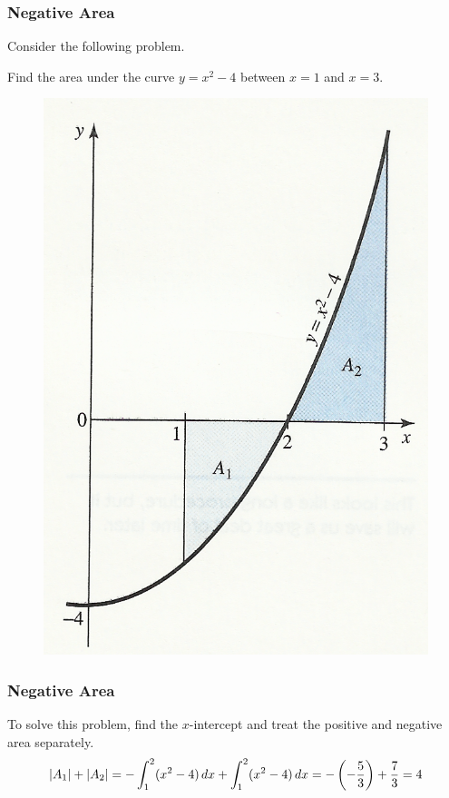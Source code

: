 \documentclass[xcolor=dvipsnames]{beamer}
\begin{document}
\begin{frame}
  \frametitle{Negative Area}
Consider the following problem.
\begin{block}{}
Find the area under the curve $y=x^{2}-4$ between $x=1$ and $x=3$.
\end{block}
\begin{figure}[h]
\includegraphics[scale=.6]{./diagrams/negarea.png}
\end{figure}
\end{frame}

\begin{frame}
  \frametitle{Negative Area}
To solve this problem, find the $x$-intercept and treat the positive
and negative area separately. 
\begin{equation}
  \label{eq:aisohphu}
  \vert{}A_{1}\vert{}+\vert{}A_{2}\vert{}=-\int_{1}^{2}(x^{2}-4)\,dx+\int_{1}^{2}(x^{2}-4)\,dx=-\left(-\frac{5}{3}\right)+\frac{7}{3}=4\notag
\end{equation}
\end{frame}
\end{document}
